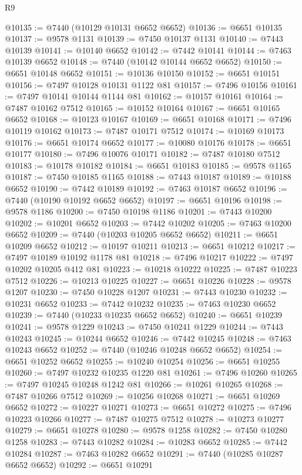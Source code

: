 \begin{lexlean}{R9}
\begin{coremodule}
@10135 := @7440 (@10129 @10131 @6652 @6652)
@10136 := @6651 @10135
@10137 := @9578 @1131
@10139 := @7450 @10137 @1131
@10140 := @7443 @10139
@10141 := @10140 @6652
@10142 := @7442 @10141
@10144 := @7463 @10139 @6652
@10148 := @7440 (@10142 @10144 @6652 @6652)
@10150 := @6651 @10148 @6652
@10151 := @10136 @10150
@10152 := @6651 @10151
@10156 := @7497 @10128 @10131 @1122 @81
@10157 := @7496 @10156
@10161 := @7497 @10141 @10144 @1144 @81
@10162 := @10157 @10161
@10164 := @7487 @10162 @7512
@10165 := @10152 @10164
@10167 := @6651 @10165 @6652
@10168 := @10123 @10167
@10169 := @6651 @10168
@10171 := @7496 @10119 @10162
@10173 := @7487 @10171 @7512
@10174 := @10169 @10173
@10176 := @6651 @10174 @6652
@10177 := @10080 @10176
@10178 := @6651 @10177
@10180 := @7496 @10076 @10171
@10182 := @7487 @10180 @7512
@10183 := @10178 @10182
@10184 := @6651 @10183
@10185 := @9578 @1165
@10187 := @7450 @10185 @1165
@10188 := @7443 @10187
@10189 := @10188 @6652
@10190 := @7442 @10189
@10192 := @7463 @10187 @6652
@10196 := @7440 (@10190 @10192 @6652 @6652)
@10197 := @6651 @10196
@10198 := @9578 @1186
@10200 := @7450 @10198 @1186
@10201 := @7443 @10200
@10202 := @10201 @6652
@10203 := @7442 @10202
@10205 := @7463 @10200 @6652
@10209 := @7440 (@10203 @10205 @6652 @6652)
@10211 := @6651 @10209 @6652
@10212 := @10197 @10211
@10213 := @6651 @10212
@10217 := @7497 @10189 @10192 @1178 @81
@10218 := @7496 @10217
@10222 := @7497 @10202 @10205 @412 @81
@10223 := @10218 @10222
@10225 := @7487 @10223 @7512
@10226 := @10213 @10225
@10227 := @6651 @10226
@10228 := @9578 @1207
@10230 := @7450 @10228 @1207
@10231 := @7443 @10230
@10232 := @10231 @6652
@10233 := @7442 @10232
@10235 := @7463 @10230 @6652
@10239 := @7440 (@10233 @10235 @6652 @6652)
@10240 := @6651 @10239
@10241 := @9578 @1229
@10243 := @7450 @10241 @1229
@10244 := @7443 @10243
@10245 := @10244 @6652
@10246 := @7442 @10245
@10248 := @7463 @10243 @6652
@10252 := @7440 (@10246 @10248 @6652 @6652)
@10254 := @6651 @10252 @6652
@10255 := @10240 @10254
@10256 := @6651 @10255
@10260 := @7497 @10232 @10235 @1220 @81
@10261 := @7496 @10260
@10265 := @7497 @10245 @10248 @1242 @81
@10266 := @10261 @10265
@10268 := @7487 @10266 @7512
@10269 := @10256 @10268
@10271 := @6651 @10269 @6652
@10272 := @10227 @10271
@10273 := @6651 @10272
@10275 := @7496 @10223 @10266
@10277 := @7487 @10275 @7512
@10278 := @10273 @10277
@10279 := @6651 @10278
@10280 := @9578 @1258
@10282 := @7450 @10280 @1258
@10283 := @7443 @10282
@10284 := @10283 @6652
@10285 := @7442 @10284
@10287 := @7463 @10282 @6652
@10291 := @7440 (@10285 @10287 @6652 @6652)
@10292 := @6651 @10291

\end{coremodule}
\end{lexlean}
